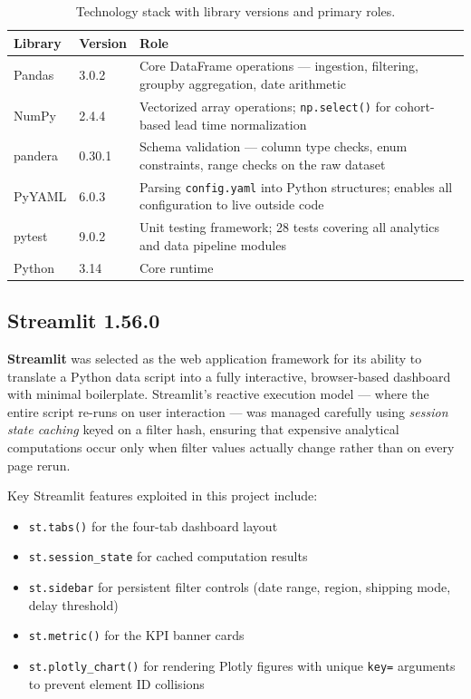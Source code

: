 \documentclass[12pt, a4paper]{report}
\begin{document}
\begin{table}[H]
  \centering
  \caption{Technology stack with library versions and primary roles.}
  \label{tab:techstack}
  \begin{tabularx}{\textwidth}{@{} L{0.25\textwidth} C{0.15\textwidth} X @{}}
    \toprule
    \textbf{Library} & \textbf{Version} & \textbf{Role} \\
    \midrule
    Pandas   & 3.0.2   & Core DataFrame operations — ingestion, filtering,
                         groupby aggregation, date arithmetic \\[4pt]
    NumPy    & 2.4.4   & Vectorized array operations; \texttt{np.select()} for
                         cohort-based lead time normalization \\[4pt]
    pandera  & 0.30.1  & Schema validation — column type checks, enum
                         constraints, range checks on the raw dataset \\[4pt]
    PyYAML   & 6.0.3   & Parsing \texttt{config.yaml} into Python structures;
                         enables all configuration to live outside code \\[4pt]
    pytest   & 9.0.2   & Unit testing framework; 28 tests covering all
                         analytics and data pipeline modules \\[4pt]
    Python   & 3.14    & Core runtime \\
    \bottomrule
  \end{tabularx}
\end{table}

\subsection{Streamlit 1.56.0}

\textbf{Streamlit} was selected as the web application framework for its ability
to translate a Python data script into a fully interactive, browser-based
dashboard with minimal boilerplate. Streamlit's reactive execution model —
where the entire script re-runs on user interaction — was managed carefully
using \emph{session state caching} keyed on a filter hash, ensuring that
expensive analytical computations occur only when filter values actually change
rather than on every page rerun.

Key Streamlit features exploited in this project include:
\begin{itemize}[leftmargin=1.5em, itemsep=4pt]
  \item \texttt{st.tabs()} for the four-tab dashboard layout
  \item \texttt{st.session\_state} for cached computation results
  \item \texttt{st.sidebar} for persistent filter controls (date range,
    region, shipping mode, delay threshold)
  \item \texttt{st.metric()} for the KPI banner cards
  \item \texttt{st.plotly\_chart()} for rendering Plotly figures with
    unique \texttt{key=} arguments to prevent element ID collisions
\end{itemize}
\end{document}
